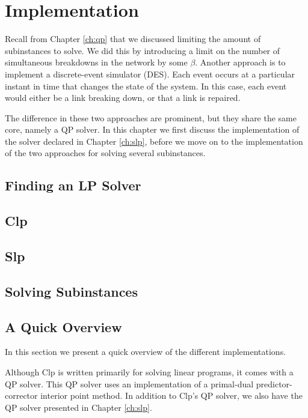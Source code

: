 \chapter{Implementation}
Recall from Chapter \ref{ch:qp} that we discussed limiting the amount
of subinstances to solve. We did this by introducing a limit on the number of
simultaneous breakdowns in the network by some $\beta$.
Another approach is to implement a discrete-event simulator (DES). Each event
occurs at a particular instant in time that changes the state of the system.
In this case, each event would either be a link breaking down, or that a link
is repaired.

The difference in these two approaches are prominent, but they share the same
core, namely a QP solver. In this chapter we first discuss the implementation
of the solver declared in Chapter \ref{ch:slp}, before we move on to the
implementation of the two approaches for solving several subinstances.
\label{ch:implementation}

\section{Finding an LP Solver}


\section{Clp}


\section{Slp}


\section{Solving Subinstances}


\section{A Quick Overview}
In this section we present a quick overview of the different
implementations.

Although Clp is written primarily for solving linear
programs, it comes with a QP solver. This QP solver uses an implementation
of a primal-dual predictor-corrector interior point method. In addition
to Clp's QP solver, we also have the QP solver presented in Chapter
\ref{ch:slp}.

